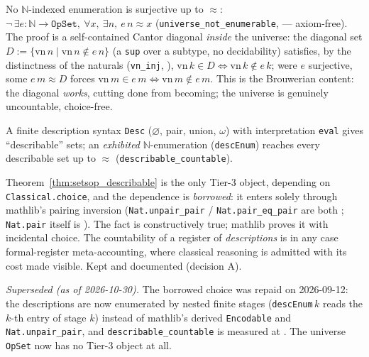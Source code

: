 \begin{theorem}
\label{thm:setsop_nonenum}
\leanok
{}
No $\mathbb{N}$-indexed enumeration is surjective up to $\approx$:
$\lnot\,\exists e:\mathbb{N}\to\texttt{OpSet},\ \forall x,\ \exists n,\ e\,n\approx x$
(\texttt{universe\_not\_enumerable}, \axiomprofile{[]} --- axiom-free).  The proof is a
self-contained Cantor diagonal \emph{inside} the universe: the diagonal set
$D := \{\mathrm{vn}\,n \mid \mathrm{vn}\,n\notin e\,n\}$ (a \texttt{sup} over a
subtype, no decidability) satisfies, by the distinctness of the naturals
(\texttt{vn\_inj}, \axiomprofile{[]}),
$\mathrm{vn}\,k\in D\iff\mathrm{vn}\,k\notin e\,k$; were $e$ surjective, some
$e\,m\approx D$ forces $\mathrm{vn}\,m\in e\,m\iff\mathrm{vn}\,m\notin e\,m$.
This is the Brouwerian content: the diagonal \emph{works}, cutting done from
becoming; the universe is genuinely uncountable, choice-free.
\end{theorem}

\begin{theorem}
\label{thm:setsop_describable}
\leanok
A finite description syntax \texttt{Desc} ($\varnothing$, pair, union, $\omega$)
with interpretation \texttt{eval} gives ``describable'' sets; an \emph{exhibited}
$\mathbb{N}$-enumeration (\texttt{descEnum}) reaches every describable set up to
$\approx$ (\texttt{describable\_countable}).
\end{theorem}

\begin{finding}
\label{find:setsop_choice}
\leanok
{}
Theorem~\ref{thm:setsop_describable} is the only Tier-3 object, depending on
\texttt{Classical.choice}, and the dependence is \emph{borrowed}: it enters
solely through mathlib's pairing inversion (\texttt{Nat.unpair\_pair} /
\texttt{Nat.pair\_eq\_pair} are both ; \texttt{Nat.pair} itself is \axiomprofile{[]}).  The fact is
constructively true; mathlib proves it with incidental choice.  The countability
of a register of \emph{descriptions} is in any case formal-register
meta-accounting, where classical reasoning is admitted with its cost made
visible.  Kept and documented (decision A).

\emph{Superseded (as of 2026-10-30).}  The borrowed choice was repaid on 2026-09-12: the
descriptions are now enumerated by nested finite stages (\texttt{descEnum}\,$k$ reads
the $k$-th entry of stage $k$) instead of mathlib's derived \texttt{Encodable} and
\texttt{Nat.unpair\_pair}, and \texttt{describable\_countable} is measured at
\axiomprofile{[]}.  The universe \texttt{OpSet} now has no Tier-3 object at all.
\end{finding}

